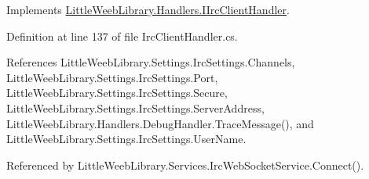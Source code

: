 Implements \mbox{\hyperlink{interface_little_weeb_library_1_1_handlers_1_1_i_irc_client_handler_a0a814a058f665efda8c88eb5306658f5}{Little\+Weeb\+Library.\+Handlers.\+I\+Irc\+Client\+Handler}}.



Definition at line 137 of file Irc\+Client\+Handler.\+cs.



References Little\+Weeb\+Library.\+Settings.\+Irc\+Settings.\+Channels, Little\+Weeb\+Library.\+Settings.\+Irc\+Settings.\+Port, Little\+Weeb\+Library.\+Settings.\+Irc\+Settings.\+Secure, Little\+Weeb\+Library.\+Settings.\+Irc\+Settings.\+Server\+Address, Little\+Weeb\+Library.\+Handlers.\+Debug\+Handler.\+Trace\+Message(), and Little\+Weeb\+Library.\+Settings.\+Irc\+Settings.\+User\+Name.



Referenced by Little\+Weeb\+Library.\+Services.\+Irc\+Web\+Socket\+Service.\+Connect().


